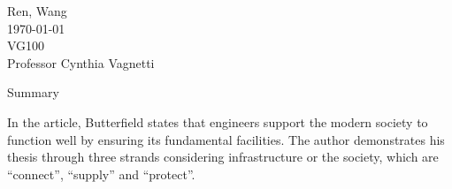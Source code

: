 \documentclass[12pt,a4]{article}
\begin{document}
\begin{flushleft}
Ren, Wang\\
\today\\
VG100\\
Professor Cynthia Vagnetti \\
\end{flushleft}

\begin{center}
Summary
\end{center}


In the article, Butterfield \cite{but} states that engineers support the modern
society to function well by ensuring its fundamental facilities. The author
demonstrates his thesis through three strands considering infrastructure or the
society, which are ``connect'', ``supply'' and ``protect''. 




\end{document}
